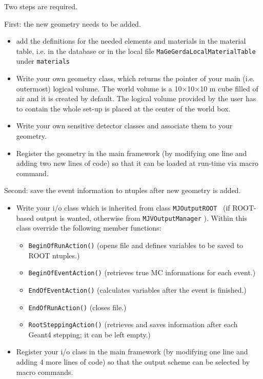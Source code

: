 \documentclass[a4paper,12pt,twoside]{article}
\begin{document}
Two steps are required.

First: the new geometry needs to be added.
\begin{itemize}
\item add the definitions for the needed elements and materials in
the material table, i.e. in the database or in the local 
file {\tt MaGeGerdaLocalMaterialTable} under {\tt materials}
\item Write your own geometry class, which returns the pointer of
your main (i.e. outermost) logical volume. The world volume 
is a 10$\times$10$\times$10 m cube filled of air and it is 
created by default. The logical volume provided by the user has to 
contain the whole set-up is placed at the center of the 
world box.
\item Write your own sensitive detector classes and associate them
to your geometry.
\item Register the geometry in the main framework
(by modifying one line and adding two new lines of code)
so that
it can be loaded at run-time via macro command.
\end{itemize}

Second: save the event information to ntuples
after new geometry is added.
\begin{itemize}
\item Write your i/o class which is inherited from class 
{\tt MJOutputROOT }
(if ROOT-based output is wanted, otherwise from {\tt MJVOutputManager} ).
Within this class override the following member functions:

\begin{itemize}
\item {\tt BeginOfRunAction()}
(opens file and defines variables to be saved to ROOT ntuples.)
\item {\tt BeginOfEventAction()}
(retrieves true MC informations for each event.)
\item {\tt EndOfEventAction()} 
(calculates variables after the event is finished.)
\item {\tt EndOfRunAction()} (closes file.)
\item {\tt RootSteppingAction()}
(retrieves and saves information after each Geant4 stepping; it can
be left empty.)
\end{itemize}

\item Register your i/o class in the main framework (by modifying one line
and adding 4 more lines of code) so that the output scheme can
be selected by macro commands.
\end{itemize}
\end{document}
